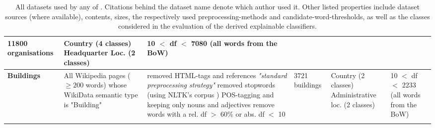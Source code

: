 \begin{landscape}
\begin{table}[]
{\begin{tabular}{@{}llllll@{}}
        		11800 organisations &
        		\specialcell[l]{ \tabitem Country (4 classes)\\ \tabitem Headquarter Loc. (2 classes)} &
        		\specialcell[l]{ 10 $<$ \acrshort{df} $<$ 7080 \\ (all words from the BoW)} \\ \midrule
        	\textbf{Buildings\footnoteref{fnote:for_alshaikh2019} \cite{Alshaikh2020}} &
        		\specialcell[l]{All Wikipedia pages ($\geq 200$ words) whose \\ WikiData semantic type is "Building"} &
        		\specialcell[l]{ \tabitem removed HTML-tags and references \\ \tabitem \textit{"standard preprocessing strategy"} \cite[137]{Alshaikh2019} \\ \tabitem removed stopwords (using NLTK's corpus \cite{loper-bird-2002-nltk})\\ \tabitem POS-tagging and keeping only nouns and adjectives \\ \tabitem remove words with a rel. \acrshort{df}  $>$ 60\% or abs. \acrshort{df} $<$ 10 } &
        		3721 buildings &
        		\specialcell[l]{ \tabitem Country (2 classes)\\ \tabitem Administrative loc. (2 classes)} &
        		\specialcell[l]{10 $<$ \acrshort{df} $<$ 2233 \\ (all words from the BoW) }\\ \Xhline{4\arrayrulewidth}
        		\\ 
		\end{tabular}
		\caption[All datasets used by any of \mainalgos.]{All datasets used by any of \mainalgos. Citations behind the dataset name denote which author used it. Other listed properties include dataset sources (where available), contents, sizes, the respectively used preprocessing-methods and candidate-word-thresholds, as well as the classes considered in the evaluation of the derived explainable classifiers.}
		\label{tab:all_datasets}
	}
	\end{table}
\end{landscape}


\restoregeometry %


